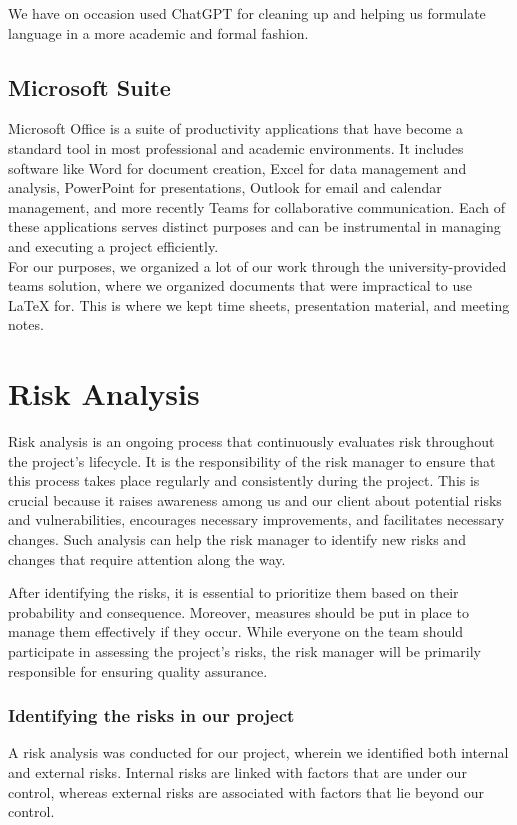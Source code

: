 We have on occasion used ChatGPT for cleaning up and helping us formulate language in a more academic and formal fashion.\\

\subsection{Microsoft Suite}
Microsoft Office is a suite of productivity applications that have become a standard tool in most professional and academic environments. It includes software like Word for document creation, Excel for data management and analysis, PowerPoint for presentations, Outlook for email and calendar management, and more recently Teams for collaborative communication. Each of these applications serves distinct purposes and can be instrumental in managing and executing a project efficiently.\\

For our purposes, we organized a lot of our work through the university-provided teams solution, where we organized documents that were impractical to use LaTeX for. This is where we kept time sheets, presentation material, and meeting notes. \\

\newpage
\section{Risk Analysis}

Risk analysis is an ongoing process that continuously evaluates risk throughout the project's lifecycle. It is the responsibility of the risk manager to ensure that this process takes place regularly and consistently during the project. This is crucial because it raises awareness among us and our client about potential risks and vulnerabilities, encourages necessary improvements, and facilitates necessary changes. Such analysis can help the risk manager to identify new risks and changes that require attention along the way. \cite{Risk1}

After identifying the risks, it is essential to prioritize them based on their probability and consequence. Moreover, measures should be put in place to manage them effectively if they occur. While everyone on the team should participate in assessing the project's risks, the risk manager will be primarily responsible for ensuring quality assurance. \cite{Risk2}

\subsubsection{Identifying the risks in our project}
A risk analysis was conducted for our project, wherein we identified both internal and external risks. Internal risks are linked with factors that are under our control, whereas external risks are associated with factors that lie beyond our control.\cite{RiskInternalExternal}

